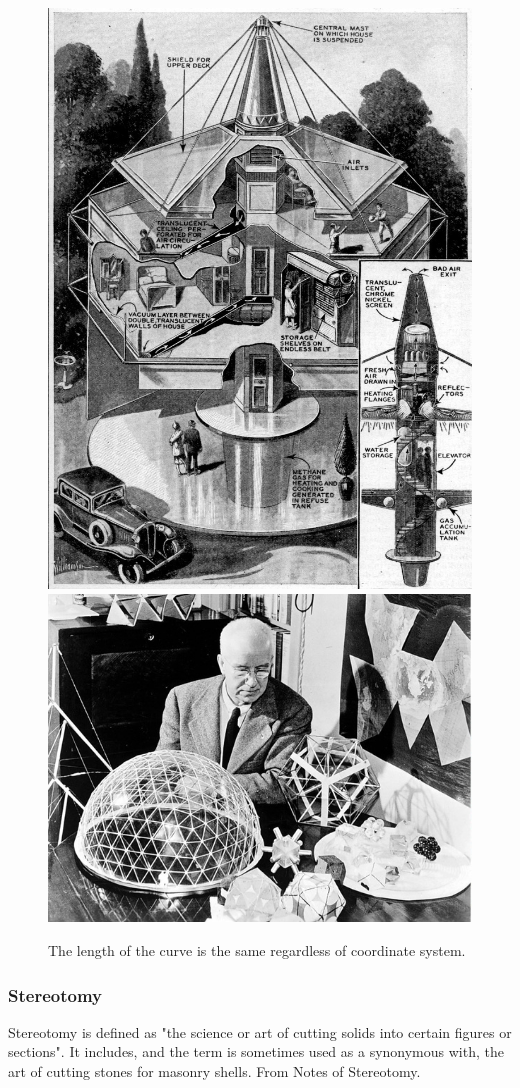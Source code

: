 \begin{figure}[H]
\centering
\includegraphics[height=0.45\linewidth ]{figure/Introduction/Fuller2.jpg}
\includegraphics[height=0.45\linewidth ]{figure/Introduction/fuller3.jpg}
\caption{The length of the curve is the same regardless of coordinate system.}
\end{figure}





\subsubsection{Stereotomy }
  
Stereotomy is defined as "the science or art of cutting solids into certain figures or sections". It includes, and the term is sometimes used as a synonymous with, the art of cutting stones for masonry shells. From Notes of Stereotomy.

